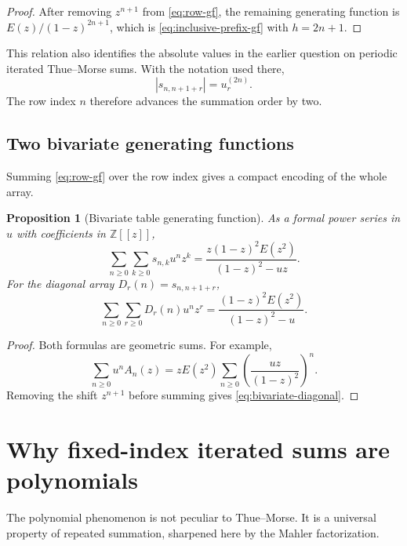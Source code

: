 \documentclass[11pt,oneside]{article}
\numberwithin{equation}{section}
\newtheorem{proposition}[theorem]{Proposition}
\theoremstyle{definition}
\theoremstyle{remark}
\newcommand{\Z}{\mathbb Z}
\newcommand{\Diag}{D}
\begin{document}
\begin{proof}
After removing \(z^{n+1}\) from \eqref{eq:row-gf}, the remaining generating
function is \(E(z)/(1-z)^{2n+1}\), which is
\eqref{eq:inclusive-prefix-gf} with \(h=2n+1\).
\end{proof}

This relation also identifies the absolute values in the earlier question on
periodic iterated Thue--Morse sums.  With the notation used there,
\begin{equation}
 |s_{n,n+1+r}|=u_r^{(2n)}.
 \label{eq:mathse-map}
\end{equation}
The row index \(n\) therefore advances the summation order by two.

\subsection{Two bivariate generating functions}

Summing \eqref{eq:row-gf} over the row index gives a compact encoding of the
whole array.

\begin{proposition}[Bivariate table generating function]
As a formal power series in \(u\) with coefficients in \(\Z[[z]]\),
\begin{equation}
 \boxed{
 \sum_{n\ge0}\sum_{k\ge0}s_{n,k}u^nz^k
 =\frac{z(1-z)^2E(z^2)}{(1-z)^2-uz}.}
 \label{eq:bivariate-table}
\end{equation}
For the diagonal array \(\Diag_r(n)=s_{n,n+1+r}\),
\begin{equation}
 \boxed{
 \sum_{n\ge0}\sum_{r\ge0}\Diag_r(n)u^nz^r
 =\frac{(1-z)^2E(z^2)}{(1-z)^2-u}.}
 \label{eq:bivariate-diagonal}
\end{equation}
\end{proposition}

\begin{proof}
Both formulas are geometric sums.  For example,
\[
 \sum_{n\ge0}u^nA_n(z)
 =zE(z^2)\sum_{n\ge0}
 \left(\frac{uz}{(1-z)^2}\right)^n.
\]
Removing the shift \(z^{n+1}\) before summing gives
\eqref{eq:bivariate-diagonal}.
\end{proof}

\section{Why fixed-index iterated sums are polynomials}

The polynomial phenomenon is not peculiar to Thue--Morse.  It is a universal
property of repeated summation, sharpened here by the Mahler factorization.
\end{document}
